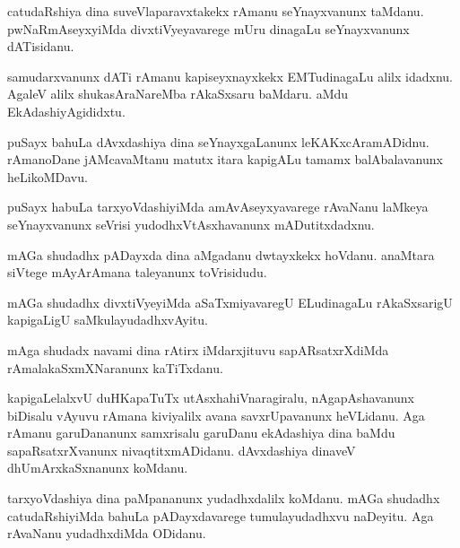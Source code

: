 \documentclass{article}
\begin{document}
\begin{mn}%
catudaRshiya dina suveVlaparavxtakekx rAmanu seYnayxvanunx taMdanu. pwNaRmAseyxyiMda 
divxtiVyeyavarege mUru dinagaLu seYnayxvanunx dATisidanu.
\end{mn}

\begin{mn}%
samudarxvanunx dATi rAmanu kapiseyxnayxkekx EMTudinagaLu alilx idadxnu. AgaleV alilx 
shukasAraNareMba rAkaSxsaru baMdaru. aMdu EkAdashiyAgididxtu.
\end{mn}

\begin{mn}%
puSayx bahuLa dAvxdashiya dina seYnayxgaLanunx leKAKxcAramADidnu. rAmanoDane jAMcavaMtanu 
matutx itara kapigALu tamamx balAbalavanunx heLikoMDavu.
\end{mn}

\begin{mn}%
puSayx habuLa tarxyoVdashiyiMda amAvAseyxyavarege rAvaNanu laMkeya seYnayxvanunx seVrisi 
yudodhxVtAsxhavanunx mADutitxdadxnu.
\end{mn}

\begin{mn}%
mAGa shudadhx pADayxda dina aMgadanu dwtayxkekx hoVdanu. anaMtara siVtege mAyArAmana 
taleyanunx toVrisidudu.
\end{mn}

\begin{mn}%
mAGa shudadhx divxtiVyeyiMda aSaTxmiyavaregU ELudinagaLu rAkaSxsarigU kapigaLigU 
saMkulayudadhxvAyitu.
\end{mn}

\begin{mn}%
mAga shudadx navami dina rAtirx iMdarxjituvu sapARsatxrXdiMda rAmalakaSxmXNaranunx 
kaTiTxdanu.
\end{mn}

\begin{mn}%
kapigaLelalxvU duHKapaTuTx utAsxhahiVnaragiralu, nAgapAshavanunx biDisalu vAyuvu rAmana 
kiviyalilx avana savxrUpavanunx heVLidanu. Aga rAmanu garuDananunx samxrisalu garuDanu 
ekAdashiya dina baMdu sapaRsatxrXvanunx nivaqtitxmADidanu. dAvxdashiya dinaveV 
dhUmArxkaSxnanunx koMdanu.
\end{mn}

\begin{mn}%
tarxyoVdashiya dina paMpananunx yudadhxdalilx koMdanu. mAGa shudadhx catudaRshiyiMda bahuLa 
pADayxdavarege tumulayudadhxvu naDeyitu. Aga rAvaNanu yudadhxdiMda ODidanu.
\end{mn}
\end{document}
